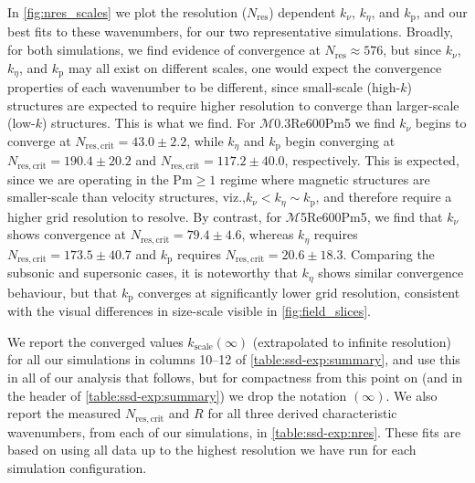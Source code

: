\documentclass[12pt,twoside]{extreport}
\newcommand{\mReh}{\ensuremath{\mathrm{Re}}} %
\newcommand{\mPrm}{\ensuremath{\mathrm{Pm}}} %
\newcommand{\mSonicMach}{\ensuremath{\mathcal{M}}} %
\newcommand{\viz}{viz.,\xspace} %
\newcommand{\SimName}[3]{$\mSonicMach${#1}$\mReh${#2}$\mPrm${#3}}
\begin{document}
In \autoref{fig:nres_scales} we plot the resolution ($N_\mathrm{res}$) dependent $k_\nu$, $k_\eta$, and $k_\mathrm{p}$, and our best fits to these wavenumbers, for our two representative simulations. Broadly, for both simulations, we find evidence of convergence at $N_\mathrm{res} \approx 576$, but since $k_\nu$, $k_\eta$, and $k_\mathrm{p}$ may all exist on different scales, one would expect the convergence properties of each wavenumber to be different, since small-scale (high-$k$) structures are expected to require higher resolution to converge than larger-scale (low-$k$) structures. This is what we find. For \SimName{0.3}{600}{5} we find $k_\nu$ begins to converge at $N_\mathrm{res, crit} = 43.0 \pm 2.2$, while $k_\eta$ and $k_\mathrm{p}$ begin converging at $N_\mathrm{res, crit} = 190.4 \pm 20.2$ and $N_\mathrm{res, crit} = 117.2 \pm 40.0$, respectively. This is expected, since we are operating in the $\mPrm \geq 1$ regime where magnetic structures are smaller-scale than velocity structures, \viz \mbox{$k_\nu < k_\eta \sim k_\mathrm{p}$}, and therefore require a higher grid resolution to resolve. By contrast, for \SimName{5}{600}{5}, we find that $k_\nu$ shows convergence at $N_\mathrm{res, crit} = 79.4 \pm 4.6$, whereas $k_\eta$ requires $N_\mathrm{res, crit} = 173.5 \pm 40.7$ and $k_\mathrm{p}$ requires $N_\mathrm{res, crit} = 20.6 \pm 18.3$. Comparing the subsonic and supersonic cases, it is noteworthy that $k_\eta$ shows similar convergence behaviour, but that $k_\mathrm{p}$ converges at significantly lower grid resolution, consistent with the visual differences in size-scale visible in \autoref{fig:field_slices}.

We report the converged values $k_\mathrm{scale}(\infty)$ (extrapolated to infinite resolution) for all our simulations in columns 10--12 of \autoref{table:ssd-exp:summary}, and use this in all of our analysis that follows, but for compactness from this point on (and in the header of \autoref{table:ssd-exp:summary}) we drop the notation $(\infty)$. We also report the measured $N_\mathrm{res, crit}$ and $R$ for all three derived characteristic wavenumbers, from each of our simulations, in \autoref{table:ssd-exp:nres}. These fits are based on using all data up to the highest resolution we have run for each simulation configuration.
\end{document}
